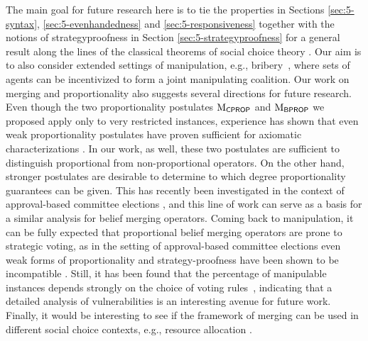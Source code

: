 The main goal for future research here is to tie the properties in
Sections \ref{sec:5-syntax}, 
\ref{sec:5-evenhandedness} and \ref{sec:5-responsiveness} 
together with the notions of strategyproofness in Section \ref{sec:5-strategyproofness}
for a general result along the lines of the classical theorems of 
social choice theory \cite{Gibbard73,Satterthwaite75,DugganS00}.
Our aim is to also consider extended settings of manipulation,
e.g., bribery~\cite{BaumeisterEER15}, where sets of agents can be 
incentivized to form a joint manipulating coalition.
Our work on merging and proportionality also suggests several directions for future research.
Even though the two proportionality postulates $\mathrm{M}_{\mathsf{CPROP}}$ and $\mathrm{M}_{\mathsf{BPROP}}$ 
we proposed apply only to very restricted instances,
experience has shown that even weak proportionality postulates 
have proven sufficient for axiomatic characterizations
\cite{LacknerS18b}.
In our work, as well, 
these two postulates are sufficient to distinguish proportional from non-proportional operators.
On the other hand, stronger postulates are desirable 
to determine to which degree proportionality guarantees can be given.
This has recently been investigated in the context of approval-based 
committee elections \cite{AzizBCEFW17,AzizEHLFS18,FernandezELGABS17}, 
and this line of work can serve as a basis for a similar analysis for belief merging operators.
Coming back to manipulation,
it can be fully expected that proportional belief merging 
operators are prone to strategic voting, 
as in the setting of approval-based committee elections 
even weak forms of proportionality and strategy-proofness have been shown to be incompatible \cite{Peters18}.
Still, it has been found that the percentage of 
manipulable instances depends strongly on the choice of voting rules~\cite{LacknerS18}, indicating that 
a detailed analysis of vulnerabilities is an interesting avenue for future work.
Finally, it would be interesting to see if the framework of merging can be used 
in different social choice contexts, e.g., resource allocation \cite{ChevaleyreEM17}.

